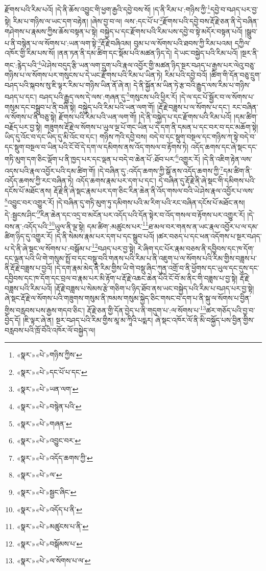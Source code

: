 རྫོགས་པའི་རིམ་པའོ། །དེ་ནི་ཆོས་འབྱུང་གི་ཕྱག་རྒྱའི་དབྱེ་བས་སོ། །ད་ནི་རིམ་པ་:གཉིས་ཀྱི་\footnote{«སྣར་»«པེ་»གཉིས་ཀྱིས་}དབྱེ་བ་བཤད་པར་བྱ་སྟེ། རིམ་པ་གཉིས་ལ་ཡང་དག་བརྟེན། །ཞེས་བྱ་བ་ལ། ལས་:དང་པོ་པ་\footnote{«སྣར་»«པེ་»དང་པོ་པ་དང་}རྫོགས་པའི་དབྱེ་བས་རྡོ་རྗེ་ཅན་ནི་དེ་བཞིན་གཤེགས་པ་རྣམས་ཀྱིས་ཆོས་བསྟན་པ་སྟེ། བསྐྱེད་པ་དང་རྫོགས་པའི་རིམ་པས་དབྱེ་བ་སྟེ་མདོར་བསྟན་པའོ། །སྒྲུབ་པ་ནི་བསྙེན་པ་ལ་སོགས་པ་:ཡན་ལག་སྟེ་\footnote{«སྣར་»«པེ་»ཡན་ལག་}རྡོ་རྗེ་བཞིའམ། བུམ་པ་ལ་སོགས་པའི་ཐབས་ཀྱི་རིམ་པའམ། དཀྱིལ་འཁོར་གྱི་རིམ་པས་སོ། །ནན་ཏན་ནི་དམ་ཚིག་དང་སྡོམ་པའི་མཚན་ཉིད་དེ། དེ་ཡང་བསྐྱེད་པའི་རིམ་པའོ། །སྔར་ནི་གང་:རྙེད་པའི་\footnote{«སྣར་»«པེ་»བསྙེན་པའི་}ཡེ་ཤེས་བདུད་རྩི་ཡན་ལག་དྲུག་པའི་རྣལ་འབྱོར་གྱི་མཚན་ཉིད་སྔར་བཤད་པ་རྒྱས་པར་ལེའུ་བཅུ་གཉིས་པ་ལ་སོགས་པར་གསུངས་པ་དེ་ཡང་རྫོགས་པའི་རིམ་པ་ཡིན་ཏེ། རིམ་པའི་དབྱེ་བའོ། །ཚིག་གི་དོན་བཅུ་དྲུག་བཤད་པའི་སྐབས་སུ་ཇི་ལྟར་རིམ་པ་གཉིས་ཡིན་ནོ་ཞེ་ན། དེ་ནི་སྐྱོན་མ་ཡིན་ཏེ་རྩ་བའི་རྒྱུད་ལས་རིམ་པ་གཉིས་བཤད་པ་དང་། བཤད་པའི་རྒྱུད་ལས་དེ་ལས་:གཞན་དུ་\footnote{«སྣར་»«པེ་»གཞན་}གསུངས་པའི་ཕྱིར་རོ། །དེ་ལ་དང་པོ་སྦྱོར་བ་ལ་སོགས་པ་གསུམ་དང་བསྒྲུབ་པ་ནི་བཞི་སྟེ། བསྐྱེད་པའི་རིམ་པའི་ཡན་ལག་གོ། །རྡོ་རྗེ་བཟླས་པ་ལ་སོགས་པ་དང་། རང་བཞིན་ལ་སོགས་པ་ནི་བཅུ་སྟེ། རྫོགས་པའི་རིམ་པའི་ཡན་ལག་གོ། །དེ་ནི་བསྐྱེད་པ་དང་རྫོགས་པའི་རིམ་པའོ། །དམ་ཚིག་བརྗོད་པར་བྱ་སྟེ། གཟུགས་རྡོ་རྗེ་ལ་སོགས་པ་ཡུལ་ལྔ་པོ་གང་ཡིན་པ་དེ་དག་ནི་དམན་པ་དང་བར་བ་དང་མཆོག་སྟེ། ཡིད་དུ་འོང་བ་དང་ཡིད་དུ་མི་འོང་བ་དང་། གཉིས་ཀའི་དབྱེ་བས། བདེ་བ་དང་སྡུག་བསྔལ་དང་གཉིས་ཀ་སྟེ་བདེ་བ་དང་སྡུག་བསྔལ་བ་ཡིན་པའི་ངོ་བོ་དེ་དག་ལ་དམིགས་ནས་འོད་གསལ་བ་རྟོགས་ཏེ། འདོད་ཆགས་དང་ཞེ་སྡང་དང་གཏི་མུག་དག་ཅིང་ལྡོག་པ་ནི་ཁྱད་པར་དང་ལྡན་པ་བདེ་བ་ཆེན་པོ་:ཐོབ་པར་\footnote{«སྣར་»«པེ་»འབྱུང་བར་}འགྱུར་རོ། །དེ་ནི་འཇིག་རྟེན་ལས་འདས་པའི་རྣལ་འབྱོར་པའི་དམ་ཚིག་གོ། །དེ་བཞིན་དུ་:འདོད་ཆགས་ཀྱི་སྒོ་ནས་འདོད་ཆགས་ཀྱི་\footnote{«སྣར་»«པེ་»འདོད་ཆགས་ཀྱི་}དམ་ཚིག་ནི་འདོད་ཆགས་ཀྱི་རང་བཞིན་ཏེ། འདོད་ཆགས་རྣམ་པར་དག་པ་དང་། དེ་བཞིན་དུ་རྡོ་རྗེ་ནི་ཞེ་སྡང་གི་དམིགས་པའི་དངོས་པོ་མཐོང་ནས། རྡོ་རྗེ་ནི་ཞེ་སྡང་རྣམ་པར་དག་ཅིང་རིན་ཆེན་ནི་འོད་གསལ་བའི་ཡེ་ཤེས་རྣལ་འབྱོར་པ་ལས་\footnote{«སྣར་»«པེ་»ལ་}འབྱུང་བར་འགྱུར་རོ། །དེ་བཞིན་དུ་གཏི་མུག་ཏུ་དམིགས་པའི་མ་རིག་པའི་རང་བཞིན་དངོས་པོ་མཐོང་ནས། དེ་:སྦྱངས་ཤིང་\footnote{«སྣར་»«པེ་»སྦྱང་ཞིང་}རིན་ཆེན་དང་འདྲ་བ་མངོན་པར་འདོད་པའི་དོན་སྟེར་བ་འོད་གསལ་བ་རྟོགས་པར་འགྱུར་རོ། །དེ་བས་ན་:འདོད་པའི་\footnote{«སྣར་»«པེ་»འདོད་པ་ནི་}ཡུལ་ནི་ལྔ་སྟེ། དམ་ཚིག་:མཚུངས་པར་\footnote{«སྣར་»«པེ་»མཚུངས་པ་ནི་}ཐ་མལ་བར་གནས་ན་ཡང་རྣལ་འབྱོར་པ་ལ་དམ་ཚིག་ཉིད་དུ་འགྱུར་རོ། །དེ་ནི་སེམས་རྣམ་པར་དག་པ་དང་སྒྲུབ་པའོ། །ཚར་བཅད་པ་དང་ཕན་འདོགས་པ་སྔར་བཤད་པ་དེ་ནི་ཞེ་སྡང་ལ་སོགས་པ་:བསྒོམ་པ་\footnote{«སྣར་»«པེ་»བསྒོམས་པ་}བཤད་པར་བྱ་སྟེ། རེ་ཞིག་དང་པོར་རྣམ་བཅས་ནི་དབྱིབས་དང་ཁ་དོག་དང་ལྡན་པའི་ཡི་གེ་གསུམ་སྤྲོ་བ་དང་བསྡུ་བའི་གནས་པའི་རིམ་པ་ནི་འཇུག་པ་ལ་སོགས་པའི་རིམ་གྱིས་བཟླས་པ་ནི་རྡོ་རྗེ་བཟླས་པ་བྱའོ། །དེ་དག་རྣམ་མེད་ནི་རིམ་གྱིས་ཡི་གེ་བསྡུ་ཞིང་ཀུན་འགྲོ་བ་ནི་ཕྱོགས་དང་ཡུལ་དང་དུས་དང་དབྱིབས་དང་ཁ་དོག་དང་བྲལ་བ་རྣམ་པར་མི་རྟོག་པ་རྡོ་རྗེ་འཆང་ཆེན་པོའི་ངོ་བོ་མ་ནིང་གི་བཟླས་པ་བྱ་སྟེ། རྡོ་རྗེ་བཟླས་པའི་རིམ་པའོ། །རྡོ་རྗེ་བཟླས་པ་སེམས་རྩེ་གཅིག་པ་ཉིད་ཐོབ་ནས་ཡང་བསྐྱེད་པའི་རིམ་པ་བཤད་པར་བྱ་སྟེ། ཞེ་སྡང་རྡོ་རྗེ་ལ་སོགས་པའི་གཟུགས་གསུམ་ནི་ཁམས་གསུམ་སྐྱེད་ཅིང་གསང་བ་དག་པ་ནི་སྐུ་ལ་སོགས་པ་བྱིན་གྱིས་བརླབས་པས་རྒྱས་གདབ་ཅིང་། རྡོ་རྗེ་ཅན་གྱི་དོན་བྱེད་པ་ནི་གདུག་པ་:ལ་སོགས་པ་\footnote{«སྣར་»«པེ་»ལ་སོགས་པ་ལ་}ཚར་གཅོད་པའི་བྱ་བ་བྱེད་དོ། །ཇི་ལྟར་ཞེ་ན། སྔར་བཤད་པའི་རིམ་གྱིས་མཱ་མ་ཀཱིའི་པདྨར། ཞེ་སྡང་འཁོར་ལོ་ནི་མི་བསྐྱོད་པས་བྱིན་གྱིས་བརླབས་པའི་ཁྲོ་བོའི་འཁོར་ལོ་བསྐྱེད་ལ། 